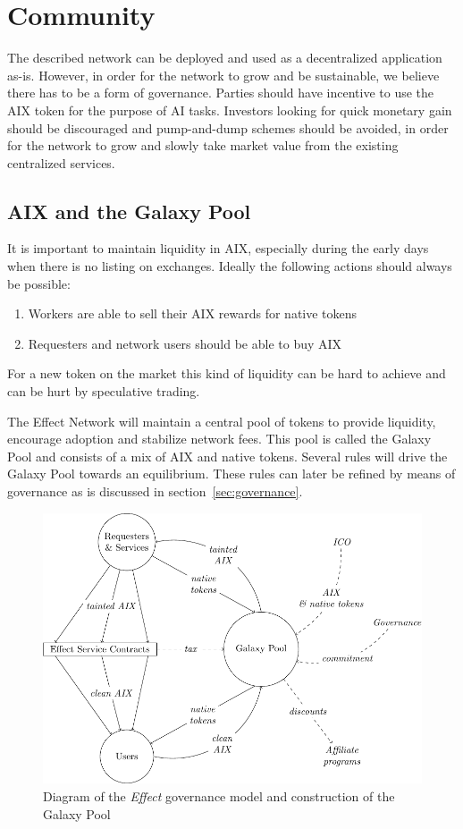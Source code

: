 \documentclass{article}
\begin{document}
\section{Community}
The described network can be deployed and used as a decentralized
application as-is. However, in order for the network to grow and be
sustainable, we believe there has to be a form of governance. Parties
should have incentive to use the AIX token for the purpose of AI
tasks. Investors looking for quick monetary gain should be discouraged
and pump-and-dump schemes should be avoided, in order for the network
to grow and slowly take market value from the existing centralized
services.

\subsection{AIX and the Galaxy Pool}
It is important to maintain liquidity in AIX, especially during the
early days when there is no listing on exchanges. Ideally the
following actions should always be possible:

\begin{enumerate}
\item Workers are able to sell their AIX rewards for native tokens
\item Requesters and network users should be able to buy AIX
\end{enumerate}

For a new token on the market this kind of liquidity can be hard to
achieve and can be hurt by speculative trading.

The Effect Network will maintain a central pool of tokens to provide
liquidity, encourage adoption and stabilize network fees. This pool is
called the Galaxy Pool and consists of a mix of AIX and native
tokens. Several rules will drive the Galaxy Pool towards an
equilibrium. These rules can later be refined by means of
governance as is discussed in section~\ref{sec:governance}.

\begin{figure}[htb]
  \includegraphics[width=\textwidth]{pictures/galaxy.pdf}
  \caption{Diagram of the \emph{Effect} governance model and
    construction of the Galaxy Pool}
\end{figure}
\end{document}
